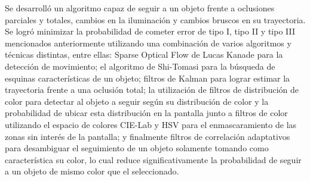 Se desarrolló un algoritmo capaz de seguir a un objeto frente a oclusiones parciales y totales, cambios en la iluminación y cambios bruscos en su trayectoria. Se logró minimizar la probabilidad de cometer error de tipo I, tipo II y tipo III mencionados anteriormente utilizando una combinación de varios algoritmos y técnicas distintas, entre ellas: Sparse Optical Flow de Lucas Kanade para la detección de movimiento; el algoritmo de Shi-Tomasi para la búsqueda de esquinas características de un objeto; filtros de Kalman para lograr estimar la trayectoria frente a una oclusión total; la utilización de filtros de distribución de color para detectar al objeto a seguir según su distribución de color y la probabilidad de ubicar esta distribución en la pantalla junto a filtros de color utilizando el espacio de colores CIE-Lab y HSV para el enmascaramiento de las zonas sin interés de la pantalla; y finalmente filtros de correlación adaptativos para desambiguar el seguimiento de un objeto solamente tomando como característica su color, lo cual reduce significativamente la probabilidad de seguir a un objeto de mismo color que el seleccionado.




